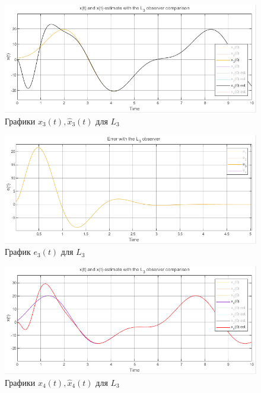 \documentclass[a4paper, 12pt]{article}
\begin{document}
    \newpage
    \vspace*{5mm}
    \begin{figure}[H]
        \centering
        \includegraphics[scale=0.7]{2task_x3comp_L3.png}
        \captionsetup{skip=0pt}
        \caption{Графики $x_3(t),\hat{x}_3(t)$ для $L_3$}
        \label{fig:2task_x3comp_L3}
    \end{figure}
    \begin{figure}[H]
        \centering
        \includegraphics[scale=0.7]{2task_e3_L3.png}
        \captionsetup{skip=0pt}
        \caption{График $e_3(t)$ для $L_3$}
        \label{fig:2task_e3_L3}
    \end{figure}
    \begin{figure}[H]
        \centering
        \includegraphics[scale=0.7]{2task_x4comp_L3.png}
        \captionsetup{skip=0pt}
        \caption{Графики $x_4(t),\hat{x}_4(t)$ для $L_3$}
        \label{fig:2task_x4comp_L3}
    \end{figure}
\end{document}
